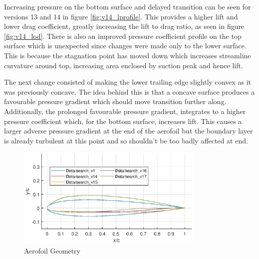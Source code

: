 \documentclass{article}
\begin{document}
Increasing pressure on the bottom surface and delayed transition can be seen for versions 13 and 14 in figure \ref{fig:v14_lprofile}.
This provides a higher lift and lower drag coefficient, greatly increasing the lift to drag ratio, as seen in figure \ref{fig:v14_lod}.
There is also an improved pressure coefficient profile on the top surface which is unexpected since changes were made only to the lower surface.
This is because the stagnation point has moved down which increases streamline curvature around top, increasing area enclosed by suction peak and hence lift.

The next change consisted of making the lower trailing edge slightly convex as it was previously concave. 
The idea behind this is that a concave surface produces a favourable pressure gradient which should move transition further along. 
Additionally, the prolonged favourable pressure gradient, integrates to a higher pressure coefficient which, for the bottom surface, increases lift.
This causes a larger adverse pressure gradient at the end of the aerofoil but the boundary layer is already turbulent at this point and so shouldn't be too badly affected at end.

\begin{figure}[H]
    \centering
    \includegraphics[width=0.8\textwidth]{figures/hiRe_geometry_17.eps}
    \caption{Aerofoil Geometry}
    \label{fig:v17_geometry}
\end{figure}
\end{document}

